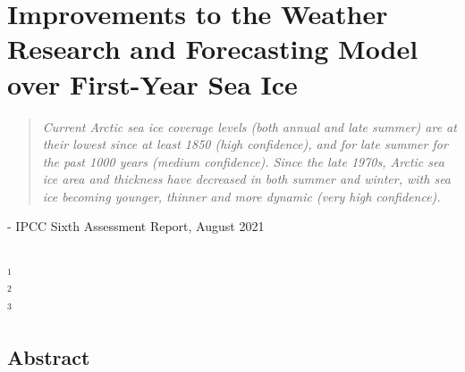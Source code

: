 \chapter{Improvements to the Weather Research and Forecasting Model over First-Year Sea Ice}
\vspace{1 cm}
\begin{spacing}{1} \begin{quote} 
\noindent \emph{Current Arctic sea ice coverage levels (both annual and late summer) are at their lowest since at least 1850 (high confidence), and for late summer for the past 1000 years (medium confidence). Since the late 1970s, Arctic sea ice area and thickness have decreased in both summer and winter, with sea ice becoming younger, thinner and more dynamic (very high confidence).}\end{quote}
\hspace{6 cm} - IPCC Sixth Assessment Report, August 2021  
\end{spacing}
\vspace{1 cm}
\noindent 
\vspace{1 cm}\\
\noindent $^1$\\
$^2$\\
$^3$\\
\section*{Abstract}

